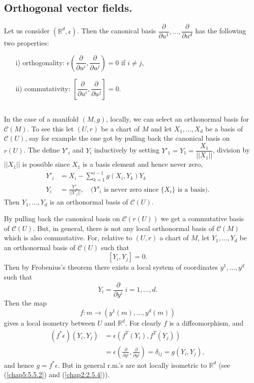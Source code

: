 \subsection{Orthogonal vector fields.}\label{chap3:3.1.10}

Let us consider $(\mathbb{R}^{d},\epsilon)$. Then the canonical basis
$\dfrac{\partial}{\partial u^{1}},\ldots,\dfrac{\partial}{\partial
  u^{d}}$ has the following two properties:
\begin{itemize}
\item[i)] orthogonality: $\epsilon\left(\dfrac{\partial}{\partial
  u^{i}},\dfrac{\partial}{\partial u^{j}}\right)=0$ if $i\neq j$,

\item[ii)] commutativity: $\left[\dfrac{\partial}{\partial
    u^{i}},\dfrac{\partial}{\partial u^{j}}\right]=0$. 
\end{itemize}

\setcounter{subsection}{10}
\subsection{}\label{chap3:3.1.11}
In the case of a manifold $(M,g)$, locally, we can select an
orthonormal basis for $\mathscr{C}(M)$. To see this let $(U,r)$ be a
chart of $M$ and let $X_{1},\ldots,X_{d}$ be a basis of
$\mathscr{C}(U)$, say for example the one got by pulling back the
canonical basis on $r(U)$. The define $Y'_{i}$ and $Y_{i}$ inductively
by setting $Y'_{1}=Y_{1}=\dfrac{X_{1}}{||X_{1}||}$, \pageoriginale
division by $||X_{1}||$ is possible since $X_{1}$ is a basis element
and hence never zero,
\begin{align*}
Y'_{i} &= X_{i}-\sum^{i-1}_{k=1}g(X_{i},Y_{k})Y_{k}\\
Y_{i} &= \frac{Y'_{i}}{||Y'_{i}||},\quad\text{($Y'_{i}$ is never zero
  since $\{X_{i}\}$ is a basis)}.
\end{align*}
Then $Y_{1},\ldots,Y_{d}$ is an orthonormal basis of $\mathscr{C}(U)$.

By pulling back the canonical basis on $\mathscr{C}(r(U))$ we get a
commutative basis of $\mathscr{C}(U)$. But, in general, there is not
any local orthonormal basis of $\mathscr{C}(M)$ which is also
commutative. For, relative to $(U,r)$ a chart of $M$, let
$Y_{1},\ldots,Y_{d}$ be an orthonormal basis of $\mathscr{C}(U)$ such
that
$$
[Y_{i},Y_{j}]=0.
$$
Then by Frobenius's theorem there exists a local system of coordinates
$y^{1},\ldots,y^{d}$ such that
$$
Y_{i}=\frac{\partial}{\partial y^{i}} \; i=1,\ldots,d.
$$
Then the map
$$
f:m\to (y^{1}(m),\ldots,y^{d}(m))
$$
gives a local isometry between $U$ and $\mathbb{R}^{d}$. For clearly
$f$ is a diffeomorphism, and
\begin{align*}
(f^{\ast}\epsilon)(Y_{i},Y_{j})
  &=\epsilon(f^{T}(Y_{i}),f^{T}(Y_{j}))\\
&= \epsilon\left(\frac{\partial}{\partial
    y^{i}},\frac{\partial}{\partial y^{j}}\right)=\delta_{ij}=g(Y_{i},Y_{j}),
\end{align*}
and \pageoriginale hence $g=f^{\ast}\epsilon$. But in general r.m.'s
are not locally isometric to $\mathbb{R}^{d}$ (see (\ref{chap5:5.5.2}) and
(\ref{chap2:2.5.4})). 

